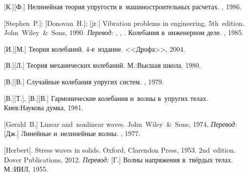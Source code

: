 \begin{thebibliography}{123}
\begin{otherlanguage}{russian}
[К.][Ф.]
Нелинейная теория упругости в~машиностроительных расчетах.
\maschinenbauleningraderverlag,
1986.

%
%



[Stephen~P.];
[Donovan~H.];
[jr.]
Vibration problems in engineering.
5th~edition.
John~Wiley~\&~Sons, 1990.
\emph{Перевод:} ,
,
.
Колебания в~инженерном деле.
\maschinenbaumoskauerverlag, 1985.

[И.][М.] Теория колебаний. 4\hbox{-}е~издание. <<Дрофа>>, 2004. 

[В.][Л.] Теория механических колебаний. М.:\;Высшая школа, 1980. 

[В.][В.] Случайные колебания упругих систем. \naukapublisher, 1979. 

[В.][Т.], [В.][В.] Гармонические колебания и~волны в~упругих телах. Киев:\;Наукова думка, 1981. 

[Gerald~B.] Linear and~nonlinear waves. John~Wiley~\&~Sons, 1974. 
\emph{Перевод:} [Дж.] Линейные и~нелинейные волны. \mirpublisher, 1977. 

[Herbert]. Stress waves in solids. Oxford, Clarendon Press, 1953.  2nd~edition. Dover Publications, 2012. 
\emph{Перевод:} [Г.] Волны напряжения в~твёрдых телах. М.:\;ИИЛ, 1955. 


\end{otherlanguage}
\end{thebibliography}
